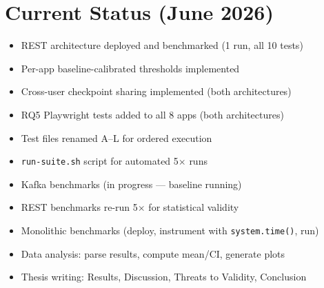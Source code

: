 \documentclass[12pt,a4paper]{article}
\begin{document}
\section{Current Status (June 2026)}

\begin{itemize}[nosep]
  \item[\checkmark] REST architecture deployed and benchmarked (1 run, all 10 tests)
  \item[\checkmark] Per-app baseline-calibrated thresholds implemented
  \item[\checkmark] Cross-user checkpoint sharing implemented (both architectures)
  \item[\checkmark] RQ5 Playwright tests added to all 8 apps (both architectures)
  \item[\checkmark] Test files renamed A--L for ordered execution
  \item[\checkmark] \texttt{run-suite.sh} script for automated 5$\times$ runs
  \item[$\circ$] Kafka benchmarks (in progress --- baseline running)
  \item[$\circ$] REST benchmarks re-run 5$\times$ for statistical validity
  \item[$\circ$] Monolithic benchmarks (deploy, instrument with \texttt{system.time()}, run)
  \item[$\circ$] Data analysis: parse results, compute mean/CI, generate plots
  \item[$\circ$] Thesis writing: Results, Discussion, Threats to Validity, Conclusion
\end{itemize}
\end{document}
